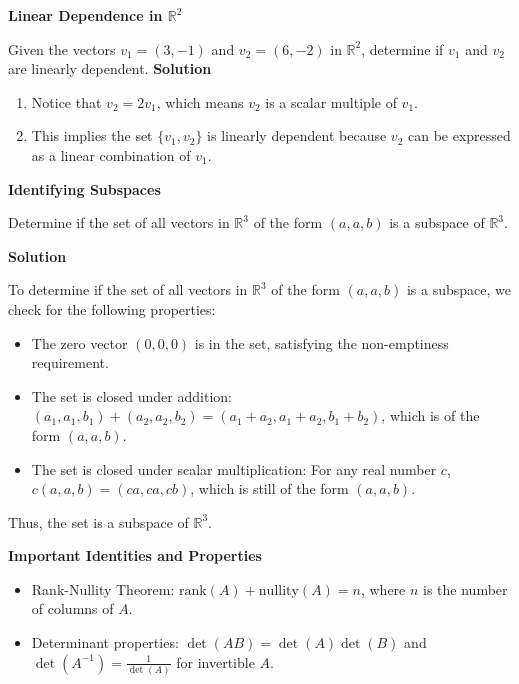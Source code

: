 \documentclass[8pt, a4paper, landscape]{extarticle}
\begin{document}
\begin{multicols*}{5}
  \textbf{Linear Dependence in $\mathbb{R}^2$}

  Given the vectors $v_1 = (3, -1)$ and $v_2 = (6, -2)$ in $\mathbb{R}^2$, determine if $v_1$ and $v_2$ are linearly dependent.
  \textbf{Solution}
  \begin{enumerate}
    \item Notice that $v_2 = 2v_1$, which means $v_2$ is a scalar multiple of $v_1$.
    \item This implies the set $\{v_1, v_2\}$ is linearly dependent because $v_2$ can be expressed as a linear combination of $v_1$.
  \end{enumerate}

  \textbf{Identifying Subspaces}

  Determine if the set of all vectors in $\mathbb{R}^3$ of the form $(a, a, b)$ is a subspace of $\mathbb{R}^3$.
    
  \textbf{Solution}

  To determine if the set of all vectors in $\mathbb{R}^3$ of the form $(a, a, b)$ is a subspace, we check for the following properties:
  \begin{itemize}
    \item The zero vector $(0, 0, 0)$ is in the set, satisfying the non-emptiness requirement.
    \item The set is closed under addition: $(a_1, a_1, b_1) + (a_2, a_2, b_2) = (a_1 + a_2, a_1 + a_2, b_1 + b_2)$, which is of the form $(a, a, b)$.
    \item The set is closed under scalar multiplication: For any real number $c$, $c(a, a, b) = (ca, ca, cb)$, which is still of the form $(a, a, b)$.
  \end{itemize}
  Thus, the set is a subspace of $\mathbb{R}^3$.

  \textbf{Important Identities and Properties}
  \begin{itemize}
    \item Rank-Nullity Theorem: $\text{rank}(A) + \text{nullity}(A) = n$, where $n$ is the number of columns of $A$.
    \item Determinant properties: $\det(AB) = \det(A)\det(B)$ and $\det(A^{-1}) = \frac{1}{\det(A)}$ for invertible $A$.
  \end{itemize}

\end{multicols*}

\pagebreak
\end{document}
